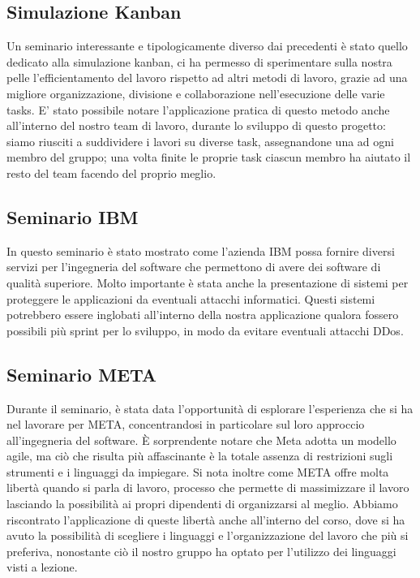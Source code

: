 \documentclass[a4paper,12pt]{article}
\begin{document}
\subsection{Simulazione Kanban}
Un seminario interessante e tipologicamente diverso dai precedenti è stato quello dedicato alla simulazione kanban, ci ha permesso di sperimentare sulla nostra pelle l'efficientamento del lavoro rispetto ad altri metodi di lavoro, grazie ad una migliore organizzazione, divisione e collaborazione  nell'esecuzione delle varie tasks. \newline
E' stato possibile notare l'applicazione pratica di questo metodo anche all'interno del nostro team di lavoro, durante lo sviluppo di questo progetto: siamo riusciti a suddividere i lavori su diverse task, assegnandone una ad ogni membro del gruppo; una volta finite le proprie task ciascun membro ha aiutato il resto del team facendo del proprio meglio.

\subsection{Seminario IBM}
In questo seminario è stato mostrato come l'azienda IBM possa fornire diversi servizi per l'ingegneria del software che permettono di avere dei software di qualità superiore. 
Molto importante è stata anche la presentazione di sistemi per proteggere le applicazioni da eventuali attacchi informatici.
Questi sistemi potrebbero essere inglobati all'interno della nostra applicazione qualora fossero possibili più sprint per lo sviluppo, in modo da evitare eventuali attacchi DDos.


\subsection{Seminario META}
Durante il seminario, è stata data l'opportunità di esplorare l'esperienza che si ha nel lavorare per META, concentrandosi in particolare sul loro approccio all'ingegneria del software. È sorprendente notare che Meta adotta un modello agile, ma ciò che risulta più affascinante è la totale assenza di restrizioni sugli strumenti e i linguaggi da impiegare. \newline
Si nota inoltre come META offre molta libertà quando si parla di lavoro, processo che permette di massimizzare il lavoro lasciando la possibilità ai propri dipendenti di organizzarsi al meglio. \newline
Abbiamo riscontrato l'applicazione di queste libertà anche all'interno del corso, dove si ha avuto la possibilità di scegliere i linguaggi e l'organizzazione del lavoro che più si preferiva, nonostante ciò il nostro gruppo ha optato per l'utilizzo dei linguaggi visti a lezione.
\end{document}
